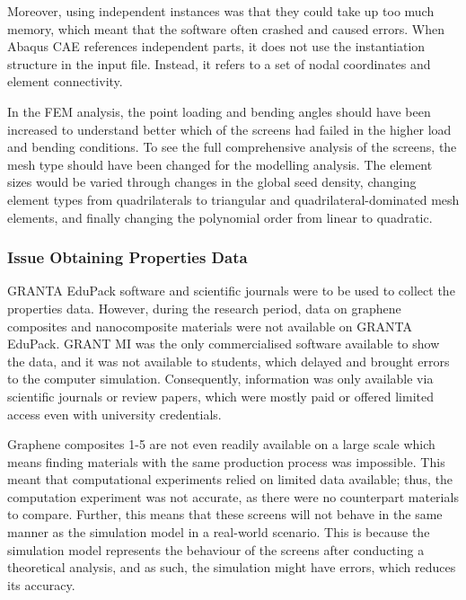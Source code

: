 \documentclass[a4paper,12pt]{article}
\numberwithin{equation}{section}
\numberwithin{figure}{section}
\begin{document}
Moreover, using independent instances was that they could take up too much memory, which meant that the software often crashed and caused errors. When Abaqus CAE references independent parts, it does not use the instantiation structure in the input file. Instead, it refers to a set of nodal coordinates and element connectivity.\vspace{\baselineskip}

\noindent In the FEM analysis, the point loading and bending angles should have been increased to understand better which of the screens had failed in the higher load and bending conditions. To see the full comprehensive analysis of the screens, the mesh type should have been changed for the modelling analysis. The element sizes would be varied through changes in the global seed density, changing element types from quadrilaterals to triangular and quadrilateral-dominated mesh elements, and finally changing the polynomial order from linear to quadratic.

\subsubsection{Issue Obtaining Properties Data}

\noindent GRANTA EduPack software and scientific journals were to be used to collect the properties data. However, during the research period, data on graphene composites and nanocomposite materials were not available on GRANTA EduPack. GRANT MI was the only commercialised software available to show the data, and it was not available to students, which delayed and brought errors to the computer simulation. Consequently, information was only available via scientific journals or review papers, which were mostly paid or offered limited access even with university credentials.\vspace{\baselineskip}

\noindent Graphene composites 1-5 are not even readily available on a large scale which means finding materials with the same production process was impossible. This meant that computational experiments relied on limited data available; thus, the computation experiment was not accurate, as there were no counterpart materials to compare. Further, this means that these screens will not behave in the same manner as the simulation model in a real-world scenario. This is because the simulation model represents the behaviour of the screens after conducting a theoretical analysis, and as such, the simulation might have errors, which reduces its accuracy.\vspace{\baselineskip}
\end{document}
